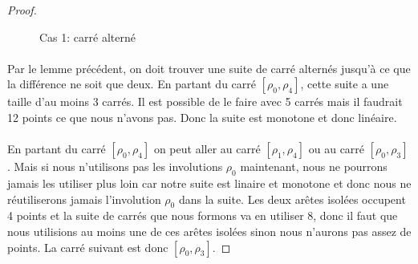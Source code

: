 \begin{proof}
  \begin{figure}[H]
    \begin{center}
      \caption{Cas 1: carré alterné}
    \end{center}
  \end{figure}

  \paragraph{}
  Par le lemme précédent, on doit trouver une suite de carré alternés jusqu'à ce que la différence ne soit que deux. En partant du carré $[\rho_0,\rho_4]$, cette suite a une taille d'au moins 3 carrés. Il est possible de le faire avec 5 carrés mais il faudrait 12 points ce que nous n'avons pas. Donc la suite est monotone et donc linéaire.

  \paragraph{}
  En partant du carré $[\rho_0,\rho_4]$ on peut aller au carré $[\rho_1,\rho_4]$ ou au carré $[\rho_0,\rho_3]$. Mais si nous n'utilisons pas les involutions $\rho_0$ maintenant, nous ne pourrons jamais les utiliser plus loin car notre suite est linaire et monotone et donc nous ne réutiliserons jamais l'involution $\rho_0$ dans la suite. Les deux arêtes isolées occupent 4 points et la suite de carrés que nous formons va en utiliser 8, donc il faut que nous utilisions au moins une de ces arêtes isolées sinon nous n'aurons pas assez de points. La carré suivant est donc $[\rho_0,\rho_3]$.


\end{proof}
